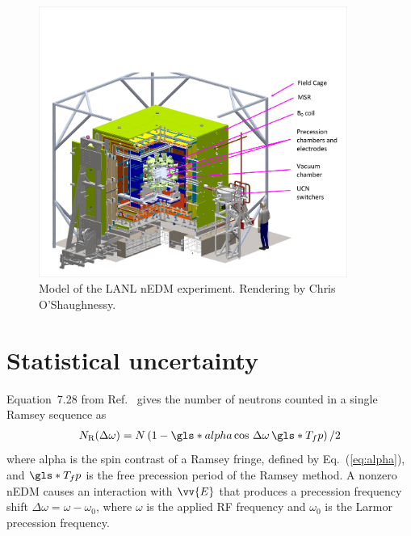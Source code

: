 \begin{figure}
    \centering
    \includegraphics[width=0.9\textwidth]{figures/envisioned_lanl_nedm.pdf}
    \caption[Model of the LANL nEDM experiment.]
    {Model of the LANL nEDM experiment. Rendering by Chris O'Shaughnessy.}
    \label{fig:envisioned_lanl_nedm}
\end{figure}


\section{Statistical uncertainty}\label{sec:figure_of_merit}


Equation~7.28 from Ref.~\cite{golubUCN} gives the number of neutrons counted in a single Ramsey sequence as
%
\begin{gather}
    N_\text{R}(\Delta \omega) = N \left( 1 - \gls*{alpha} \cos \,\Delta \omega \, \gls*{T_fp} \right)/2 \label{eq:neutrons_in_ramsey_seq}
\end{gather}
%
where \gls*{alpha} is the spin contrast of a Ramsey fringe, defined by Eq.~(\ref{eq:alpha}), and $\gls*{T_fp}$ is the free precession period of the Ramsey method. A nonzero nEDM causes an interaction with $\vv{E}$ that produces a precession frequency shift $\Delta\omega=\omega-\omega_0$, where $\omega$ is the applied RF frequency and $\omega_0$ is the Larmor precession frequency. 

